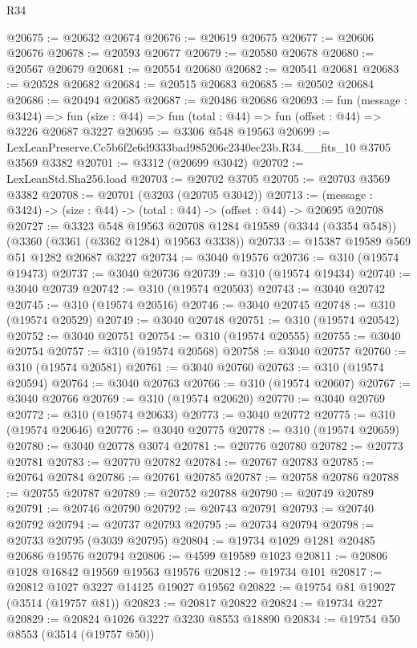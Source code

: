 \begin{lexlean}{R34}
\begin{coremodule}
@20675 := @20632 @20674
@20676 := @20619 @20675
@20677 := @20606 @20676
@20678 := @20593 @20677
@20679 := @20580 @20678
@20680 := @20567 @20679
@20681 := @20554 @20680
@20682 := @20541 @20681
@20683 := @20528 @20682
@20684 := @20515 @20683
@20685 := @20502 @20684
@20686 := @20494 @20685
@20687 := @20486 @20686
@20693 := fun (message : @3424) =>
  fun (size : @44) => fun (total : @44) => fun (offset : @44) => @3226 @20687 @3227
@20695 := @3306 @548 @19563
@20699 := LexLeanPreserve.Cc5b6f2e6d9333bad985206c2340ec23b.R34.__fits_10 @3705 @3569 @3382
@20701 := @3312 (@20699 @3042)
@20702 := LexLeanStd.Sha256.load
@20703 := @20702 @3705
@20705 := @20703 @3569 @3382
@20708 := @20701 (@3203 (@20705 @3042))
@20713 := (message : @3424) -> (size : @44) -> (total : @44) -> (offset : @44) -> @20695 @20708
@20727 := @3323
    @548
    @19563
    @20708
    @1284
    @19589
    (@3344 (@3354 @548))
    (@3360 (@3361 (@3362 @1284) @19563 @3338))
@20733 := @15387 @19589 @569 @51 @1282 @20687 @3227
@20734 := @3040 @19576
@20736 := @310 (@19574 @19473)
@20737 := @3040 @20736
@20739 := @310 (@19574 @19434)
@20740 := @3040 @20739
@20742 := @310 (@19574 @20503)
@20743 := @3040 @20742
@20745 := @310 (@19574 @20516)
@20746 := @3040 @20745
@20748 := @310 (@19574 @20529)
@20749 := @3040 @20748
@20751 := @310 (@19574 @20542)
@20752 := @3040 @20751
@20754 := @310 (@19574 @20555)
@20755 := @3040 @20754
@20757 := @310 (@19574 @20568)
@20758 := @3040 @20757
@20760 := @310 (@19574 @20581)
@20761 := @3040 @20760
@20763 := @310 (@19574 @20594)
@20764 := @3040 @20763
@20766 := @310 (@19574 @20607)
@20767 := @3040 @20766
@20769 := @310 (@19574 @20620)
@20770 := @3040 @20769
@20772 := @310 (@19574 @20633)
@20773 := @3040 @20772
@20775 := @310 (@19574 @20646)
@20776 := @3040 @20775
@20778 := @310 (@19574 @20659)
@20780 := @3040 @20778 @3074
@20781 := @20776 @20780
@20782 := @20773 @20781
@20783 := @20770 @20782
@20784 := @20767 @20783
@20785 := @20764 @20784
@20786 := @20761 @20785
@20787 := @20758 @20786
@20788 := @20755 @20787
@20789 := @20752 @20788
@20790 := @20749 @20789
@20791 := @20746 @20790
@20792 := @20743 @20791
@20793 := @20740 @20792
@20794 := @20737 @20793
@20795 := @20734 @20794
@20798 := @20733 @20795 (@3039 @20795)
@20804 := @19734 @1029 @1281 @20485 @20686 @19576 @20794
@20806 := @4599 @19589 @1023
@20811 := @20806 @1028 @16842 @19569 @19563 @19576
@20812 := @19734 @101
@20817 := @20812 @1027 @3227 @14125 @19027 @19562
@20822 := @19754 @81 @19027 (@3514 (@19757 @81))
@20823 := @20817 @20822
@20824 := @19734 @227
@20829 := @20824 @1026 @3227 @3230 @8553 @18890
@20834 := @19754 @50 @8553 (@3514 (@19757 @50))

\end{coremodule}
\end{lexlean}
